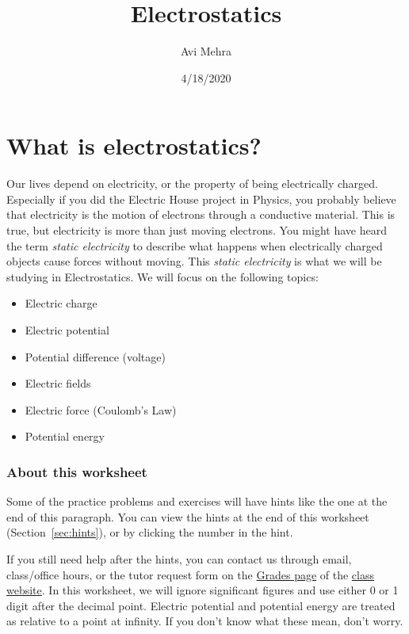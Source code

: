 \documentclass[12pt,paper=letter]{scrartcl}
\begin{document}
    \title{Electrostatics}
    \author{Avi Mehra}
    \date{4/18/2020}
    \maketitle


    \section{What is electrostatics?}\label{sec:what-is-electrostatics?}
    \pnp
    Our lives depend on electricity, or the property of being electrically charged.
    \pnp
    Especially if you did the Electric House project in Physics, you probably believe that electricity is the motion of electrons through a conductive material.
    This is true, but electricity is more than just moving electrons.
    \pnp
    You might have heard the term \emph{static electricity} to describe what happens when electrically charged objects cause forces without moving.
    This \emph{static electricity} is what we will be studying in Electrostatics.
    We will focus on the following topics:

    \begin{itemize}[topsep=2pt,itemsep=-0.7ex,partopsep=1ex,parsep=1ex]
        \item Electric charge
        \item Electric potential
        \item Potential difference (voltage)
        \item Electric fields
        \item Electric force (Coulomb's Law)
        \item Potential energy
    \end{itemize}

    \subsubsection{About this worksheet}
    Some of the practice problems and exercises will have hints like the one at the end of this paragraph.
    You can view the hints at the end of this worksheet (Section~\ref{sec:hints}), or by clicking the number in the hint. \hint{\ref{hint:ex}}

    \pnp

    If you still need help after the hints,
    you can contact us through email, class/office hours, or the tutor request form on the \href{https://tiny.cc/shieh/grades}{Grades page} of the \href{https://tiny.cc/shieh}{class website}.
    \pnp
    In this worksheet, we will ignore significant figures and use either 0 or 1 digit after the decimal point.
    Electric potential and potential energy are treated as relative to a point at infinity.
    If you don't know what these mean, don't worry.
\end{document}
